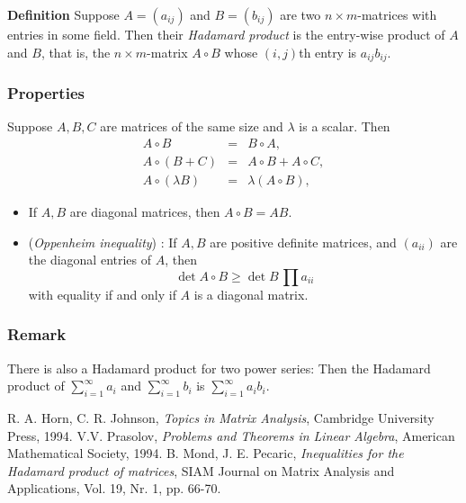 \documentclass[12pt]{article}
\begin{document}
{\bf Definition}
Suppose $A=(a_{ij})$ and $B=(b_{ij})$ are two $n\times m$-matrices
with entries in some field. Then their \emph{Hadamard product} is
the entry-wise product of $A$ and $B$, that is, 
the $n\times m$-matrix $A\circ B$ whose $(i,j)$th entry is $a_{ij} b_{ij}$.

\subsubsection*{Properties}
Suppose $A,B,C$ are matrices of the same size and $\lambda$
is a scalar. Then
\begin{eqnarray*}
A\circ B &=& B\circ A, \\
A\circ (B+C) &=& A\circ B + A\circ C, \\
A\circ (\lambda B) &=& \lambda (A\circ B),
\end{eqnarray*}

\begin{itemize}
\item If $A,B$ are diagonal matrices, then $A\circ B=AB$. 
\item (\emph{Oppenheim inequality}) \cite{prasolov}: If $A,B$ are positive definite matrices, and
$(a_{ii})$ are the diagonal entries of $A$, then
$$\det A\circ B \ge \det B\,\prod{a_{ii}}$$
with equality if and only if $A$ is a diagonal matrix.
\end{itemize}

\subsubsection*{Remark}
There is also a Hadamard product for two power series: Then the
Hadamard product of $\sum_{i=1}^\infty a_i$ and $\sum_{i=1}^\infty b_i$ is
$\sum_{i=1}^\infty a_i b_i$. 

\begin{thebibliography}{9}
 R. A. Horn, C. R. Johnson,
  \emph{Topics in Matrix Analysis},
  Cambridge University Press, 1994.
 V.V. Prasolov,
 \emph{Problems and Theorems in Linear Algebra},
 American Mathematical Society, 1994.
  B. Mond, J. E. Pecaric,
 \emph{Inequalities for the Hadamard product of matrices},
 SIAM Journal on Matrix Analysis and Applications,
 Vol. 19, Nr. 1, pp. 66-70.
\end{thebibliography}
\end{document}
